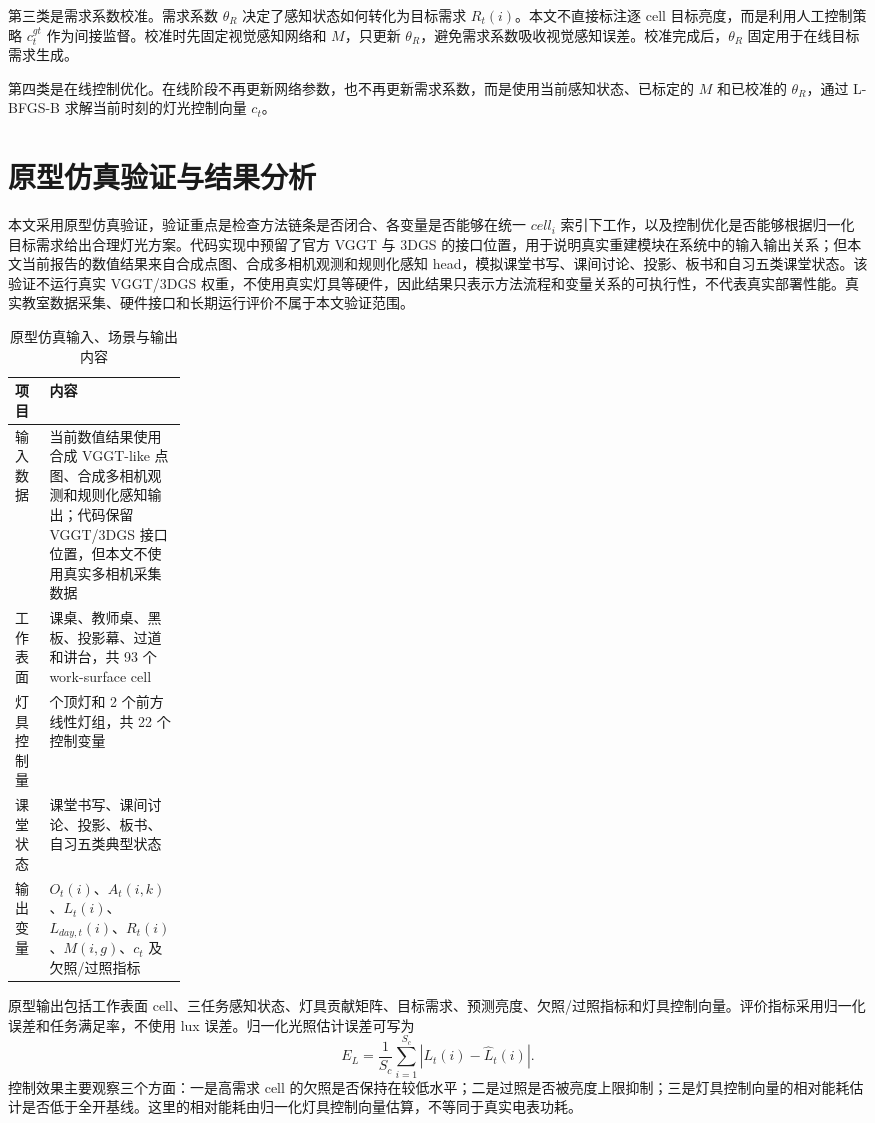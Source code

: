 \documentclass[UTF8,a4paper,zihao=-4]{ctexart}
\begin{document}
第三类是需求系数校准。需求系数 $\theta_R$ 决定了感知状态如何转化为目标需求 $R_t(i)$。本文不直接标注逐 cell 目标亮度，而是利用人工控制策略 $c_t^{gt}$ 作为间接监督。校准时先固定视觉感知网络和 $M$，只更新 $\theta_R$，避免需求系数吸收视觉感知误差。校准完成后，$\theta_R$ 固定用于在线目标需求生成。

第四类是在线控制优化。在线阶段不再更新网络参数，也不再更新需求系数，而是使用当前感知状态、已标定的 $M$ 和已校准的 $\theta_R$，通过 L-BFGS-B 求解当前时刻的灯光控制向量 $c_t$。

\section{原型仿真验证与结果分析}

本文采用原型仿真验证，验证重点是检查方法链条是否闭合、各变量是否能够在统一 $cell_i$ 索引下工作，以及控制优化是否能够根据归一化目标需求给出合理灯光方案。代码实现中预留了官方 VGGT 与 3DGS 的接口位置，用于说明真实重建模块在系统中的输入输出关系；但本文当前报告的数值结果来自合成点图、合成多相机观测和规则化感知 head，模拟课堂书写、课间讨论、投影、板书和自习五类课堂状态。该验证不运行真实 VGGT/3DGS 权重，不使用真实灯具等硬件，因此结果只表示方法流程和变量关系的可执行性，不代表真实部署性能。真实教室数据采集、硬件接口和长期运行评价不属于本文验证范围。

\begin{table}[H]
  \centering
  \caption{原型仿真输入、场景与输出内容}
  \label{tab:prototype-setting}
  \begin{tabularx}{\linewidth}{>{\raggedright\arraybackslash}p{0.20\linewidth}>{\raggedright\arraybackslash}X}
    \toprule
    项目 & 内容 \\
    \midrule
    输入数据 & 当前数值结果使用合成 VGGT-like 点图、合成多相机观测和规则化感知输出；代码保留 VGGT/3DGS 接口位置，但本文不使用真实多相机采集数据 \\
    工作表面 & 课桌、教师桌、黑板、投影幕、过道和讲台，共 93 个 work-surface cell \\
    灯具控制量 & 20 个顶灯和 2 个前方线性灯组，共 22 个控制变量 \\
    课堂状态 & 课堂书写、课间讨论、投影、板书、自习五类典型状态 \\
    输出变量 & $O_t(i)$、$A_t(i,k)$、$L_t(i)$、$L_{day,t}(i)$、$R_t(i)$、$M(i,g)$、$c_t$ 及欠照/过照指标 \\
    \bottomrule
  \end{tabularx}
\end{table}

原型输出包括工作表面 cell、三任务感知状态、灯具贡献矩阵、目标需求、预测亮度、欠照/过照指标和灯具控制向量。评价指标采用归一化误差和任务满足率，不使用 lux 误差。归一化光照估计误差可写为
\begin{equation}
E_L=\frac{1}{S_c}\sum_{i=1}^{S_c}|L_t(i)-\widehat{L}_t(i)|.
\end{equation}
控制效果主要观察三个方面：一是高需求 cell 的欠照是否保持在较低水平；二是过照是否被亮度上限抑制；三是灯具控制向量的相对能耗估计是否低于全开基线。这里的相对能耗由归一化灯具控制向量估算，不等同于真实电表功耗。
\end{document}
